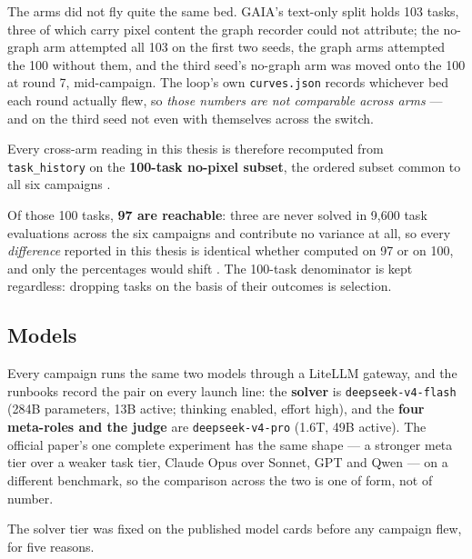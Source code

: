 The arms did not fly quite the same bed. GAIA's text-only split holds 103
tasks, three of which carry pixel content the graph recorder could not
attribute; the no-graph arm attempted all 103 on the first two seeds, the
graph arms attempted the 100 without them, and the third seed's no-graph
arm was moved onto the 100 at round 7, mid-campaign. The loop's own
\texttt{curves.json} records whichever bed each round actually flew, so
\emph{those numbers are not comparable across arms} --- and on the third
seed not even with themselves across the switch.

Every cross-arm reading in this thesis is therefore recomputed from
\texttt{task\_history} on the \textbf{100-task no-pixel subset}, the
ordered subset common to all six campaigns .

Of those 100 tasks, \textbf{97 are reachable}: three are never solved in
9{,}600 task evaluations across the six campaigns and contribute no
variance at all, so every \emph{difference} reported in this thesis is
identical whether computed on 97 or on 100, and only the percentages would
shift . The 100-task denominator is kept regardless: dropping tasks
on the basis of their outcomes is selection.

\subsection*{Models}

Every campaign runs the same two models through a LiteLLM gateway, and the
runbooks record the pair on every launch line: the \textbf{solver} is
\texttt{deepseek-v4-flash} (284B parameters, 13B active; thinking enabled,
effort high), and the \textbf{four meta-roles and the judge} are
\texttt{deepseek-v4-pro} (1.6T, 49B active). The official paper's one
complete experiment has the same shape --- a stronger meta tier over a
weaker task tier, Claude Opus over Sonnet, GPT and Qwen --- on a different
benchmark, so the comparison across the two is one of form, not of
number.

The solver tier was fixed on the published model cards before any campaign
flew, for five reasons.


